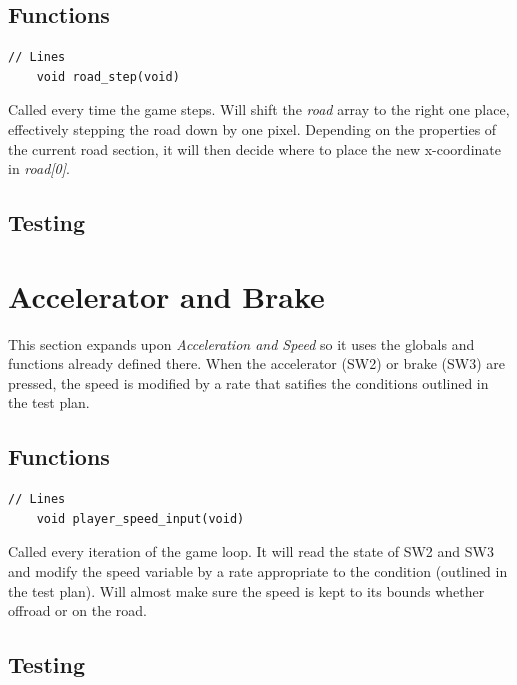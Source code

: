 \documentclass{article}
\begin{document}
\subsection*{Functions}
\begin{lstlisting}[style=CStyle]
	// Lines
	void road_step(void)
\end{lstlisting}
Called every time the game steps. Will shift the \emph{road} array to the right one place, effectively stepping the road down by one pixel. Depending on the properties of the current road section, it will then decide where to place the new x-coordinate in \emph{road[0]}.
\newline

\subsection*{Testing}

\clearpage

\section{Accelerator and Brake}
This section expands upon \emph{Acceleration and Speed} so it uses the globals and functions already defined there. When the accelerator (SW2) or brake (SW3) are pressed, the speed is modified by a rate that satifies the conditions outlined in the test plan.
 
\subsection*{Functions}
\begin{lstlisting}[style=CStyle]
	// Lines
	void player_speed_input(void)
\end{lstlisting}
Called every iteration of the game loop. It will read the state of SW2 and SW3 and modify the speed variable by a rate appropriate to the condition (outlined in the test plan). Will almost make sure the speed is kept to its bounds whether offroad or on the road.
\newline

\subsection*{Testing}
\end{document}
